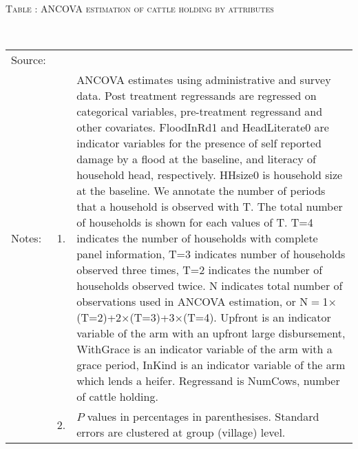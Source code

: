 \hspace{-1cm}\begin{minipage}[t]{14cm}
\hfil\textsc{\normalsize Table \thetable: ANCOVA estimation of cattle holding by attributes\label{tab ANCOVA cow attributes}}\\
\setlength{\tabcolsep}{1pt}
\setlength{\baselineskip}{8pt}
\renewcommand{\arraystretch}{.55}
\hfil{}\\
\renewcommand{\arraystretch}{.8}
\setlength{\tabcolsep}{1pt}
\begin{tabular}{>{\hfill\scriptsize}p{1cm}<{}>{\hfill\scriptsize}p{.25cm}<{}>{\scriptsize}p{12cm}<{\hfill}}
Source:& \multicolumn{2}{l}{\scriptsize Estimated with GUK administrative and survey data.}\\
Notes: & 1. & ANCOVA estimates using administrative and survey data. Post treatment regressands are regressed on categorical variables, pre-treatment regressand and other covariates. \textsf{FloodInRd1} and \textsf{HeadLiterate0} are indicator variables for the presence of self reported damage by a flood at the baseline, and literacy of household head, respectively. \textsf{HHsize0} is household size at the baseline. We annotate the number of periods that a household is observed with \textsf{T}. The total number of households is shown for each values of \textsf{T}. \textsf{T=4} indicates the number of households with complete panel information, \textsf{T=3} indicates number of households observed three times, \textsf{T=2} indicates the number of households observed twice. \textsf{N} indicates total number of observations used in ANCOVA estimation, or \textsf{N$=$1$\times$(T=2)+2$\times$(T=3)+3$\times$(T=4)}.  \textsf{Upfront} is an indicator variable of the arm with an upfront large disbursement, \textsf{WithGrace} is an indicator variable of the arm with a grace period, \textsf{InKind} is an indicator variable of the arm which lends a heifer. Regressand is \textsf{NumCows}, number of cattle holding. \\
& 2. & $P$ values in percentages in parenthesises. Standard errors are clustered at group (village) level.
\end{tabular}
\end{minipage}

